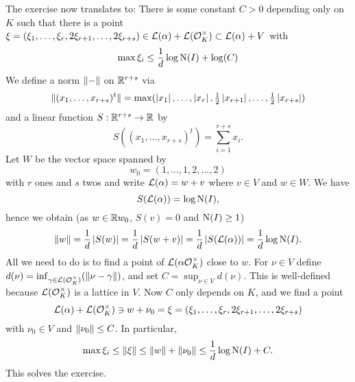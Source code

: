 \documentclass[a4paper,11pt]{article}
\begin{document}
\begin{enumerate}[wide, labelindent=0pt]
        The exercise now translates to: There is some constant $C > 0$ depending only
        on $K$ such that there is a point $\xi = (\xi_1, \dots, \xi_r, 2\xi_{r+1}, \dots,
        2\xi_{r+s}) \in \mathcal{L}(\alpha) + \mathcal{L}(\mathcal{O}_K^\times) \subset \mathcal{L}(\alpha)+V$ with 
        \begin{equation*}
             \max \xi_i \leq \frac 1d \log \operatorname{N}(I) + \log(C)
        \end{equation*}
        We define a norm $\lVert-\rVert$ on $\mathbb{R}^{r+s}$ via 
        \begin{equation*}
            \lVert(x_1, \dots, x_{r+s})^t \rVert = \max (\left\lvert x_1 \right\rvert, \dots, \left\lvert x_r \right\rvert,
            \tfrac 12 \left\lvert x_{r+1} \right\rvert, \dots, \tfrac 12 \left\lvert x_{r+s} \right\rvert)
        \end{equation*}
        and a linear function $S: \mathbb{R}^{r+s} \to \mathbb{R}$
        by
        \begin{equation*}
            S((x_1,\dots, x_{r+s})^t) = \sum_{i=1}^{r+s} x_i.
        \end{equation*}
        Let $W$ be the vector space spanned by 
        \begin{equation*}
            w_0 =  (1,\dots,1,2, \dots, 2)
        \end{equation*}
        with $r$ ones and $s$ twos and 
        write $\mathcal{L}(\alpha) = w + v$ where $v \in V$ and $w \in W$. We have 
        \begin{equation*}
            S(\mathcal{L}(\alpha)) = \log \operatorname{N}(I),
        \end{equation*}
        hence we obtain (as $w \in \mathbb{R} w_0$, $S(v) = 0$ and $\operatorname{N}(I) \geq 1$)
        $$\lVert w\rVert = \frac 1{d} \left\lvert S(w) \right\rvert 
        = \frac 1d \left\lvert S(w+v) \right\rvert = \frac 1d \left\lvert S(\mathcal{L}(\alpha)) \right\rvert = \frac 1d \log \operatorname{N}(I).$$
        All we need to do is to find a point of $\mathcal{L}(\alpha \mathcal{O}_K^\times)$
        close to $w$. For $\nu \in V$ define $d(\nu) = \inf_{\gamma \in \mathcal{L}(\mathcal{O}_K^\times)}
        (\lVert\nu-\gamma\rVert)$, and set $C = \sup_{\nu \in V} d(\nu)$. This 
        is well-defined because $\mathcal{L}(\mathcal{O}_K^\times)$ is a lattice in $V$.
        Now $C$ only depends on $K$, and we find a point 
        $$\mathcal{L}(\alpha) + \mathcal{L}(\mathcal{O}_K^\times) \ni w + \nu_0 = \xi = (\xi_1,\dots, \xi_r,
        2\xi_{r+1},\dots, 2\xi_{r+s})$$
        with $\nu_0 \in V$ and $\lVert\nu_0\rVert \leq C$. In particular,
        \begin{equation*}
        \max \xi_i \leq \lVert\xi\rVert \leq \lVert w\rVert + \lVert\nu_0\rVert \leq
        \frac 1d \log \operatorname{N}(I) + C.
        \end{equation*}
        This solves the exercise.
        

\end{enumerate}
\end{document}
